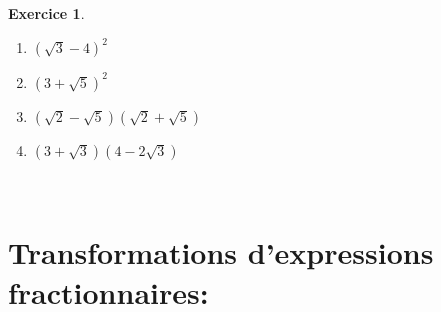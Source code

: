 \documentclass[a4paper,10pt]{article}
\newtheorem{exer}{Exercice}
\begin{document}
\begin{minipage}[t]{1.0\linewidth}
\begin{minipage}[t]{0.4\linewidth}
\begin{exer}
				\begin{enumerate}
					\item $(\sqrt{3}-4)^2 $
					\item $(3+\sqrt{5})^2 $
					\item $(\sqrt{2}-\sqrt{5})(\sqrt{2}+\sqrt{5}) $
					\item $(3+\sqrt{3})(4-2\sqrt{3})$ 
				\end{enumerate}
	
		\end{exer}

		
	\end{minipage}
\end{minipage}

\quad\\

\section*{Transformations d'expressions fractionnaires:}	
\quad\\	
\end{document}
